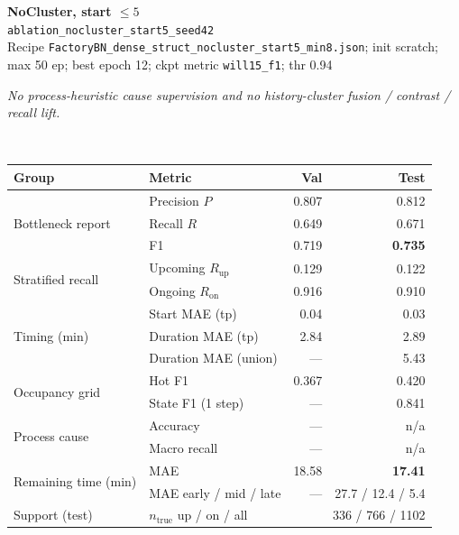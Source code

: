 \documentclass[9pt,a4paper,twocolumn]{extarticle}
\begin{document}
\noindent\begin{minipage}{\columnwidth}
\begin{center}
{\small\bfseries NoCluster, start $\le 5$}\\
{\scriptsize\texttt{ablation\_nocluster\_start5\_seed42}}\\
{\scriptsize Recipe \texttt{FactoryBN\_dense\_struct\_nocluster\_start5\_min8.json}; init scratch; max 50 ep; best epoch 12; ckpt metric \texttt{will15\_f1}; thr 0.94}\\[1pt]
\parbox{0.96\columnwidth}{\scriptsize\itshape No process-heuristic cause supervision and no history-cluster fusion / contrast / recall lift.}\\[2pt]
\scriptsize\setlength{\tabcolsep}{3pt}
\begin{tabular}{llrr}
\toprule
Group & Metric & Val & Test \\
\midrule
\multirow{3}{*}{Bottleneck report}
  & Precision $P$ & 0.807 & 0.812 \\
  & Recall $R$ & 0.649 & 0.671 \\
  & F1 & 0.719 & \textbf{0.735} \\
\midrule
\multirow{2}{*}{Stratified recall}
  & Upcoming $R_{\mathrm{up}}$ & 0.129 & 0.122 \\
  & Ongoing $R_{\mathrm{on}}$ & 0.916 & 0.910 \\
\midrule
\multirow{3}{*}{Timing (min)}
  & Start MAE (tp) & 0.04 & 0.03 \\
  & Duration MAE (tp) & 2.84 & 2.89 \\
  & Duration MAE (union) & --- & 5.43 \\
\midrule
\multirow{2}{*}{Occupancy grid}
  & Hot F1 & 0.367 & 0.420 \\
  & State F1 (1 step) & --- & 0.841 \\
\midrule
\multirow{2}{*}{Process cause}
  & Accuracy & --- & n/a \\
  & Macro recall & --- & n/a \\
\midrule
\multirow{2}{*}{Remaining time (min)}
  & MAE & 18.58 & \textbf{17.41} \\
  & MAE early / mid / late & --- & 27.7 / 12.4 / 5.4 \\
\midrule
Support (test)
  & $n_{\mathrm{true}}$ up / on / all & \multicolumn{2}{r}{336 / 766 / 1102} \\
\bottomrule
\end{tabular}
\end{center}
\end{minipage}\par\vspace{6pt}
\end{document}

